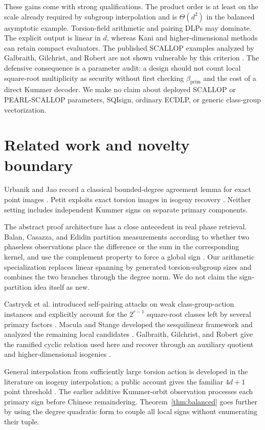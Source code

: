 \documentclass[11pt]{article}
\newcommand{\betaP}{\beta_{\mathrm{prim}}}
\begin{document}
These gains come with strong qualifications.  The product order is at least
on the scale already required by subgroup interpolation and is
$\Theta(d^2)$ in the balanced asymptotic example.  Torsion-field arithmetic
and pairing DLPs may dominate.  The explicit output is linear in $d$, whereas
Kani and higher-dimensional methods can retain compact evaluators.  The
published SCALLOP examples analyzed by Galbraith, Gilchrist, and Robert are
not shown vulnerable by this criterion \cite{ggr-volcanoes}.  The defensive
consequence is a parameter audit: a design should not count local square-root
multiplicity as security without first checking $\betaP$ and the cost of a
direct Kummer decoder.  We make no claim about deployed SCALLOP or
PEARL-SCALLOP parameters, SQIsign, ordinary ECDLP, or generic class-group
vectorization.

\section{Related work and novelty boundary}

Urbanik and Jao record a classical bounded-degree agreement lemma for exact
point images \cite{urbanik-jao}.  Petit exploits exact torsion images in
isogeny recovery \cite{petit-torsion}.  Neither setting includes independent
Kummer signs on separate primary components.

The abstract proof architecture has a close antecedent in real phase
retrieval.  Balan, Casazza, and Edidin partition measurements according to
whether two phaseless observations place the difference or the sum in the
corresponding kernel, and use the complement property to force a global sign
\cite{balan-phase}.  Our arithmetic specialization replaces linear spanning
by generated torsion-subgroup sizes and combines the two branches through the
degree norm.  We do not claim the sign-partition idea itself as new.

Castryck et al. introduced self-pairing attacks on weak class-group-action
instances and explicitly account for the $2^{r-1}$ square-root classes left by
several primary factors \cite{castryck-selfpairings}.  Macula and Stange
developed the sesquilinear framework and analyzed the remaining local
candidates \cite{macula-stange}.  Galbraith, Gilchrist, and Robert give the
ramified cyclic relation used here and recover through an auxiliary quotient
and higher-dimensional isogenies \cite{ggr-volcanoes}.

General interpolation from sufficiently large torsion action is developed in
the literature on isogeny interpolation; a public account gives the familiar
$4d+1$ point threshold \cite{castryck-ants,robert-survey}.  The earlier
additive Kummer-orbit observation processes each primary sign before Chinese
remaindering.  Theorem~\ref{thm:balanced} goes further by using the degree
quadratic form to couple all local signs without enumerating their tuple.
\end{document}
